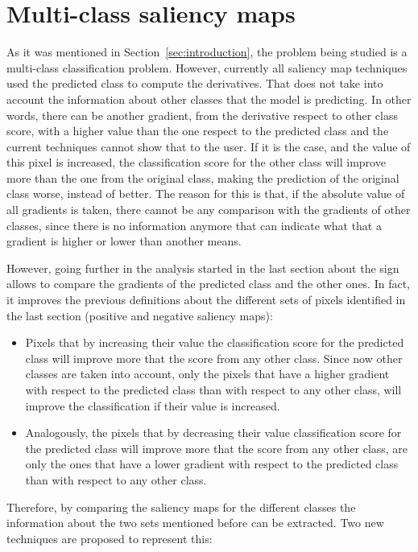 \documentclass[preprint,12pt]{elsarticle}
\begin{document}
\section{Multi-class saliency maps}
\label{sec:multi-class saliency map}
As it was mentioned in Section~\ref{sec:introduction}, the problem being studied is a multi-class classification problem. However, currently all saliency map techniques used the predicted class to compute the derivatives. That does not take into account the information about other classes that the model is predicting. In other words, there can be another gradient, from the derivative respect to other class score, with a higher value than the one respect to the predicted class and the current techniques cannot show that to the user. If it is the case, and the value of this pixel is increased, the classification score for the other class will improve more than the one from the original class, making the prediction of the original class worse, instead of better. The reason for this is that, if the absolute value of all gradients is taken, there cannot be any comparison with the gradients of other classes, since there is no information anymore that can indicate what that a gradient is higher or lower than another means.

However, going further in the analysis started in the last section about the sign allows to compare the gradients of the predicted class and the other ones. In fact, it improves the previous definitions about the different sets of pixels identified in the last section (positive and negative saliency maps):

\begin{itemize}
    \item Pixels that by increasing their value the classification score for the predicted class will improve more that the score from any other class. Since now other classes are taken into account, only the pixels that have a higher gradient with respect to the predicted class than with respect to any other class, will improve the classification if their value is increased.
    \item Analogously, the pixels that by decreasing their value classification score for the predicted class will improve more that the score from any other class, are only the ones that have a lower gradient with respect to the predicted class than with respect to any other class.
\end{itemize}

Therefore, by comparing the saliency maps for the different classes the information about the two sets mentioned before can be extracted. Two new techniques are proposed to represent this:
\end{document}
